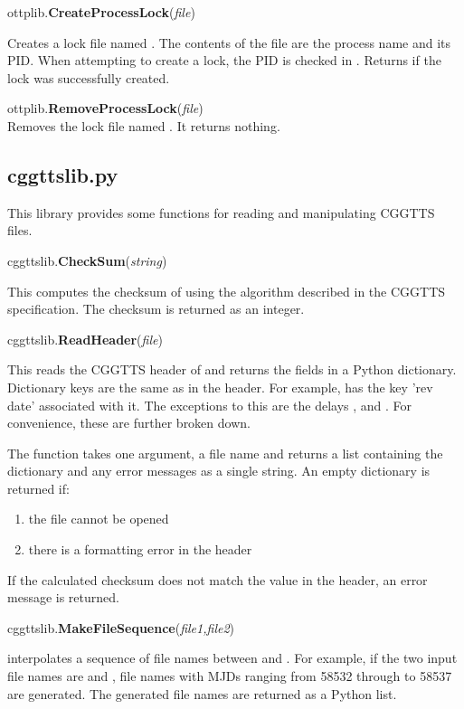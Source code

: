 ottplib.{\bfseries{CreateProcessLock}}(\textit{file})

Creates a lock file named . 
The contents of the file are the process name and its PID.
When attempting to create a lock, the PID is checked in .
Returns  if the lock was successfully created.

ottplib.{\bfseries{RemoveProcessLock}}(\textit{file})\\
Removes the lock file named .
It returns nothing.

\subsection{cggttslib.py}

This library provides some functions for reading and manipulating CGGTTS files.

cggttslib.{\bfseries{CheckSum}}(\textit{string})

This computes the checksum of  using the algorithm described in
the CGGTTS specification. The checksum is returned as an integer.

cggttslib.{\bfseries{ReadHeader}}(\textit{file})

This reads the CGGTTS header of  and returns the fields in a Python dictionary.
Dictionary keys are the same as in the header. For example,  
has the key 'rev date' associated with it. The exceptions to this are the delays
,  and . For convenience, these are further
broken down.

The function takes one argument, a file name and returns a list containing
the dictionary and any error messages as a single string. 
An empty dictionary is returned if:
\begin{enumerate}
\item the file cannot be opened
\item there is a formatting error in the header
\end{enumerate}
If the calculated checksum does not match the value in the header, an error message is returned.

cggttslib.{\bfseries{MakeFileSequence}}(\textit{file1,file2})

 interpolates a sequence of file names between  and .
For example, if the two input file names are  and ,
file names with MJDs ranging from 58532 through to 58537 are generated. The generated file names are 
returned as a Python list.

